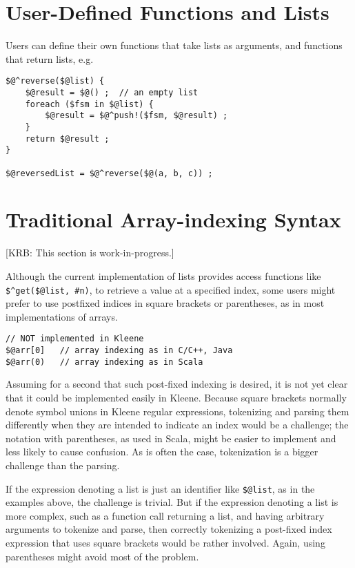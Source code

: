 \section{User-Defined Functions and Lists}


Users can define their own functions that take lists as arguments, and functions
that return lists, e.g.\@

\begin{Verbatim}
$@^reverse($@list) {
    $@result = $@() ;  // an empty list
    foreach ($fsm in $@list) {
        $@result = $@^push!($fsm, $@result) ;
    }
    return $@result ;
}

$@reversedList = $@^reverse($@(a, b, c)) ;
\end{Verbatim}


\section{Traditional Array-indexing Syntax}


[KRB:  This section is work-in-progress.]

Although the current implementation of lists provides access functions like
\verb!$^get($@list, #n)!, to retrieve a value at a specified index, 
some users might prefer to use postfixed indices in
square brackets or parentheses, as in most implementations of arrays.

\begin{Verbatim}
// NOT implemented in Kleene
$@arr[0]   // array indexing as in C/C++, Java
$@arr(0)   // array indexing as in Scala
\end{Verbatim}

\noindent
Assuming for a second that such post-fixed indexing is desired, it is not yet
clear that it could be implemented easily in Kleene.
Because square brackets normally denote symbol unions in Kleene regular
expressions, tokenizing and
parsing them differently when they are intended to indicate an index would be a
challenge; the notation with parentheses, as used in Scala, might be easier to
implement and
less likely to cause confusion.  As is often the case, tokenization is a bigger
challenge than the parsing.

If the expression denoting a list is just an
identifier like \verb!$@list!, as in the examples above, the challenge is trivial.  But if the
expression denoting a list is more complex, such as a function call returning a list,
and having arbitrary arguments to tokenize and parse, then correctly tokenizing a
post-fixed index expression that uses square brackets would be rather involved.
Again, using parentheses might avoid most of the problem.

